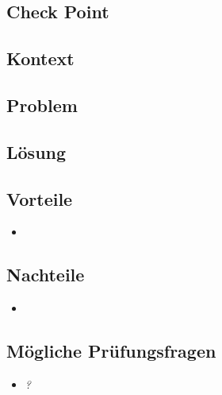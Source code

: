 \subsection{Check Point}
\label{sec:checkpoint}



\subsection*{Kontext}


\subsection*{Problem}

\subsection*{Lösung}

\subsection*{Vorteile}
\begin{itemize}
	\item
\end{itemize}

\subsection*{Nachteile}
\begin{itemize}
	\item
\end{itemize}

\subsection*{Mögliche Prüfungsfragen}
\begin{itemize}
	\item \emph{?}\\

\end{itemize}